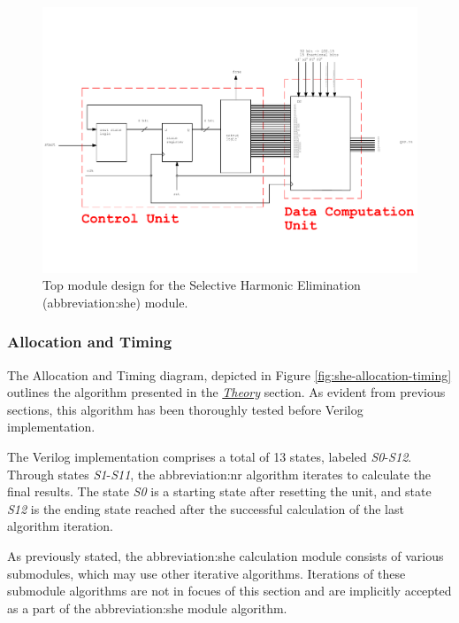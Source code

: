 \documentclass[a4paper, twoside, 11pt]{article}
\begin{document}
            \begin{figure}[htbp!]
                \centering
                \includegraphics[width=1\textwidth]{src/pdf/she-top-module.pdf}
                           \caption{Top module design for the Selective Harmonic Elimination (\gls{abbreviation:she}) module.}
                \label{fig:she-top-module}
            \end{figure}

    \FloatBarrier
        \subsubsection{Allocation and Timing}\label{subsubsec:she-allocation-and-timing}
            The Allocation and Timing diagram, depicted in Figure \ref{fig:she-allocation-timing} outlines the algorithm presented in the \hyperref[subsec:she-theory]{\textit{Theory}} section. As evident from previous sections, this algorithm has been thoroughly tested before Verilog implementation.\par
            The Verilog implementation comprises a total of 13 states, labeled \textit{S0}-\textit{S12}. Through states \textit{S1}-\textit{S11}, the \gls{abbreviation:nr} algorithm iterates to calculate the final results. The state \textit{S0} is a starting state after resetting the unit, and state \textit{S12} is the ending state reached after the successful calculation of the last algorithm iteration.\par
            As previously stated, the \gls{abbreviation:she} calculation module consists of various submodules, which may use other iterative algorithms. Iterations of these submodule algorithms are not in focues of this section and are implicitly accepted as a part of the \gls{abbreviation:she} module algorithm.
\end{document}
